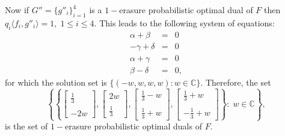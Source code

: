 \documentclass[final,1p,times]{elsarticle}
\begin{document}


Now if $G''= \{ g''_i \}_{i=1}^4$ is a $1-$erasure probabilistic optimal dual of $F$ then $q_i \langle f_i,g''_i \rangle =1,\;1\leq i \leq 4.$ This leads to the following system of equations:
\begin{equation}
	\begin{array}{ccl}
		  \alpha + \beta &=& 0\\
		 -\gamma + \delta  &=&0 \\
		 \alpha +\gamma &=& 0\\
		  \beta -\delta  &=& 0,
	\end{array}
\end{equation}
for which the solution set is $\{(-w,w,w,w): w \in \mathbb{C}\}.$ Therefore, the set
$$ \left\{ \left\{ \left[\begin{array}{r} \frac{1}{3}  \\~\\ -2w \end{array}\right], \left[\begin{array}{r} 2w \\~\\ \frac{1}{3}  \end{array}\right], \left[\begin{array}{r} \frac{1}{3} -w \\~\\ \frac{1}{3}  + w \end{array}\right] , \left[\begin{array}{r} \frac{1}{3} + w \\~\\ -\frac{1}{3}  + w \end{array}\right]      \right\}: \; w \in \mathbb{C} \right\}, $$
is the set of $1-$erasure probabilistic  optimal duals of $F.$\\~\\
\end{document}
